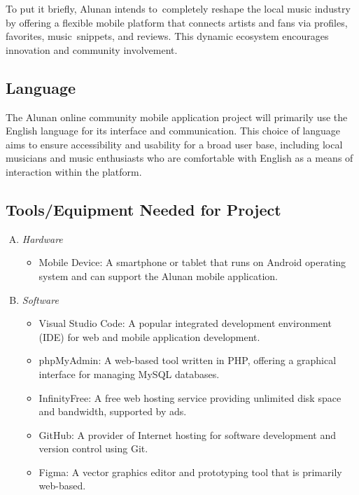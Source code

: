 To put it briefly, Alunan intends to completely reshape the local music industry by offering a flexible mobile platform that connects artists and fans via profiles, favorites, music snippets, and reviews. This dynamic ecosystem encourages innovation and community involvement.

\subsection{Language}
The Alunan online community mobile application project will primarily use the English language for its interface and communication. This choice of language aims to ensure accessibility and usability for a broad user base, including local musicians and music enthusiasts who are comfortable with English as a means of interaction within the platform.

\subsection{Tools/Equipment Needed for Project}
\begin{enumerate}[A.]
    \item \textit{Hardware}
    \begin{itemize}
        \item Mobile Device: A smartphone or tablet that runs on Android operating system and can support the Alunan mobile application.
    \end{itemize}
    \item \textit{Software}
    \begin{itemize}
        \item Visual Studio Code: A popular integrated development environment (IDE) for web and mobile application development.
        \item phpMyAdmin: A web-based tool written in PHP, offering a graphical interface for managing MySQL databases.
        \item InfinityFree: A free web hosting service providing unlimited disk space and bandwidth, supported by ads.
        \item GitHub: A provider of Internet hosting for software development and version control using Git.
        \item Figma: A vector graphics editor and prototyping tool that is primarily web-based.
    \end{itemize}
\end{enumerate}

